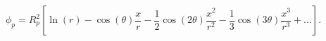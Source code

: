 \begin{equation}
\phi_p =R_p^2 \left[ \ln(r) - \cos(\theta) \frac{x}{r}  - \frac{1}{2} \cos(2\theta) \frac{x^2}{r^2} - \frac{1}{3}\cos(3\theta)\frac{x^3}{r^3}  + \ldots\right].
\end{equation}
\normalsize